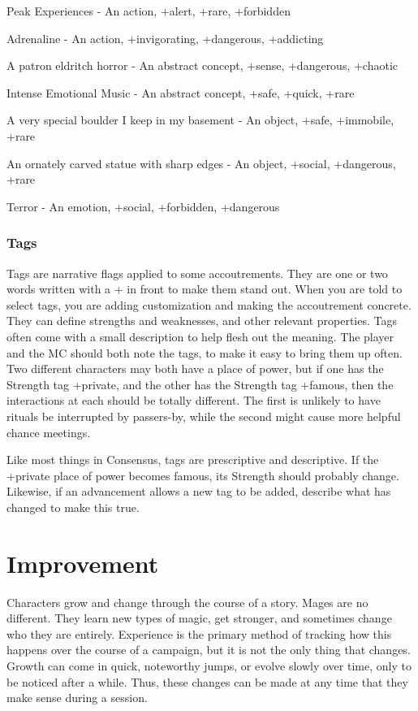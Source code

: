 \documentclass[
]{memoir}
\begin{document}
Peak Experiences - An action, +alert, +rare, +forbidden

Adrenaline - An action, +invigorating, +dangerous, +addicting

A patron eldritch horror - An abstract concept, +sense, +dangerous,
+chaotic

Intense Emotional Music - An abstract concept, +safe, +quick, +rare

A very special boulder I keep in my basement - An object, +safe,
+immobile, +rare

An ornately carved statue with sharp edges - An object, +social,
+dangerous, +rare

Terror - An emotion, +social, +forbidden, +dangerous

\hypertarget{tags}{%
\subsection{Tags}\label{tags}}

Tags are narrative flags applied to some accoutrements. They are one or
two words written with a + in front to make them stand out. When you are
told to select tags, you are adding customization and making the
accoutrement concrete. They can define strengths and weaknesses, and
other relevant properties. Tags often come with a small description to
help flesh out the meaning. The player and the MC should both note the
tags, to make it easy to bring them up often. Two different characters
may both have a place of power, but if one has the Strength tag
+private, and the other has the Strength tag +famous, then the
interactions at each should be totally different. The first is unlikely
to have rituals be interrupted by passers-by, while the second might
cause more helpful chance meetings.

Like most things in Consensus, tags are prescriptive and descriptive. If
the +private place of power becomes famous, its Strength should probably
change. Likewise, if an advancement allows a new tag to be added,
describe what has changed to make this true.

\newpage

\hypertarget{improvement-1}{%
\chapter{Improvement}\label{improvement-1}}

Characters grow and change through the course of a story. Mages are no
different. They learn new types of magic, get stronger, and sometimes
change who they are entirely. Experience is the primary method of
tracking how this happens over the course of a campaign, but it is not
the only thing that changes. Growth can come in quick, noteworthy jumps,
or evolve slowly over time, only to be noticed after a while. Thus,
these changes can be made at any time that they make sense during a
session.
\end{document}
